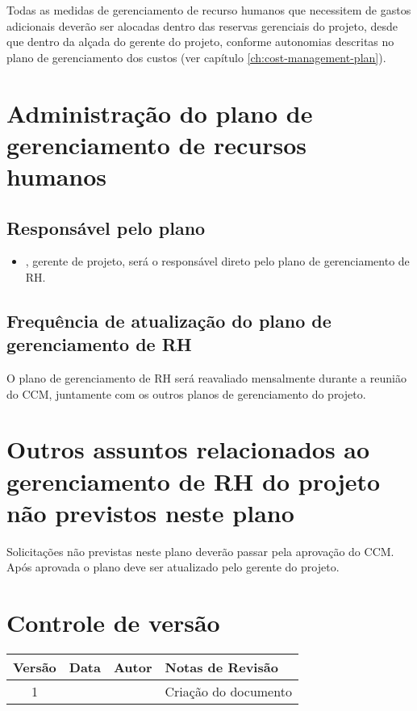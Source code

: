 Todas as medidas de gerenciamento de recurso humanos que necessitem de gastos adicionais deverão ser alocadas dentro das reservas gerenciais do projeto, desde que dentro da alçada do gerente do projeto, conforme autonomias descritas no plano de gerenciamento dos custos (ver capítulo \ref{ch:cost-management-plan}). 

\section{Administração do plano de gerenciamento de recursos humanos}

\subsection{Responsável pelo plano}

\begin{itemize}
	\item \projectManagerName{}, gerente de projeto, será o responsável direto pelo plano de gerenciamento de RH.
\end{itemize}

\subsection{Frequência de atualização do plano de gerenciamento de RH}

O plano de gerenciamento de RH será reavaliado mensalmente durante a reunião do CCM, juntamente com os outros planos de gerenciamento do projeto.

\section{Outros assuntos relacionados ao gerenciamento de RH do projeto não previstos neste plano}

Solicitações não previstas neste plano deverão passar pela aprovação do CCM. Após aprovada o plano deve ser atualizado pelo gerente do projeto.

\section{Controle de versão}

\begin{table}[H]
	\begin{tabularx}{\textwidth}{| c | c | X | X |}
		\hline
		\textbf{Versão} & \textbf{Data} & \textbf{Autor}        & \textbf{Notas de Revisão} \\
		\hline
		1                &               & \projectManagerName{} & Criação do documento     \\
		\hline
	\end{tabularx}
	\centering
\end{table}

